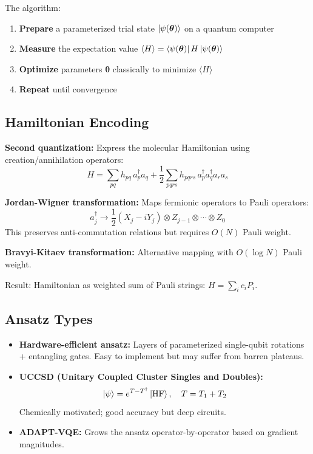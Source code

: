 \documentclass[11pt,a4paper]{article}
\begin{document}
The algorithm:
\begin{enumerate}
    \item \textbf{Prepare} a parameterized trial state $\ket{\psi(\boldsymbol{\theta})}$ on a quantum computer
    \item \textbf{Measure} the expectation value $\langle H \rangle = \bra{\psi(\boldsymbol{\theta})}H\ket{\psi(\boldsymbol{\theta})}$
    \item \textbf{Optimize} parameters $\boldsymbol{\theta}$ classically to minimize $\langle H \rangle$
    \item \textbf{Repeat} until convergence
\end{enumerate}

\subsection{Hamiltonian Encoding}

\textbf{Second quantization:} Express the molecular Hamiltonian using creation/annihilation operators:
\begin{equation}
    H = \sum_{pq} h_{pq}\, a_p^\dagger a_q + \frac{1}{2}\sum_{pqrs} h_{pqrs}\, a_p^\dagger a_q^\dagger a_r a_s
\end{equation}

\textbf{Jordan-Wigner transformation:} Maps fermionic operators to Pauli operators:
\begin{equation}
    a_j^\dagger \rightarrow \frac{1}{2}(X_j - iY_j) \otimes Z_{j-1} \otimes \cdots \otimes Z_0
\end{equation}
This preserves anti-commutation relations but requires $O(N)$ Pauli weight.

\textbf{Bravyi-Kitaev transformation:} Alternative mapping with $O(\log N)$ Pauli weight.

Result: Hamiltonian as weighted sum of Pauli strings: $H = \sum_i c_i P_i$.

\subsection{Ansatz Types}

\begin{itemize}
    \item \textbf{Hardware-efficient ansatz:} Layers of parameterized single-qubit rotations + entangling gates. Easy to implement but may suffer from barren plateaus.
    \item \textbf{UCCSD (Unitary Coupled Cluster Singles and Doubles):}
    \begin{equation}
        \ket{\psi} = e^{T - T^\dagger}\ket{\mathrm{HF}}, \quad T = T_1 + T_2
    \end{equation}
    Chemically motivated; good accuracy but deep circuits.
    \item \textbf{ADAPT-VQE:} Grows the ansatz operator-by-operator based on gradient magnitudes.
\end{itemize}
\end{document}
